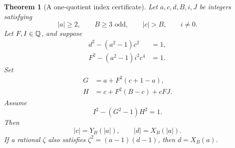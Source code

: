 \documentclass[11pt]{article}
\newtheorem{theorem}{Theorem}
\begin{document}
\begin{theorem}[A one-quotient index certificate]\label{index}
Let \(a,c,d,B,i,J\) be integers satisfying
\[
 |a|\ge2,\qquad B\ge3\text{ odd},\qquad |c|>B,\qquad i\ne0.
\]
Let \(F,I\in\mathbb Q\), and suppose
\begin{align}
 d^2-(a^2-1)c^2&=1,\label{norm1}\\
 F^2-(a^2-1)i^2c^4&=1.\label{norm2}
\end{align}
Set
\begin{align}
 G&=a+F^2(c+1-a),\label{bridge}\\
 H&=c+F^2(B-c)+cFJ.\label{CRT}
\end{align}
Assume
\begin{equation}\label{norm3}
                       I^2-(G^2-1)H^2=1.
\end{equation}
Then
\[
              |c|=Y_B(|a|),\qquad |d|=X_B(|a|).
\]
If a rational \(\zeta\) also satisfies
\(\zeta^2=(a-1)(d-1)\), then \(d=X_B(a)\).
\end{theorem}
\end{document}
